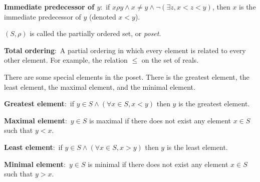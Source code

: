 \documentclass[nobib]{tufte-handout}
\newcommand{\defn}[2]{\noindent\textbf{#1}:\ #2}
\begin{document}
\defn{Immediate predecessor of $y$}{if $x\rho y \land x \neq y \land \neg (\exists z, x < z< y)$, then $x$ is the 
immediate predecessor of $y$ (denoted $x<y$)}. 

$(S, \rho)$ is called the partially ordered set, or \emph{poset}. 

\defn{Total ordering}{A partial ordering in which every element is related to 
every other element}. For example, the relation $\leq$ on the set of reals. 

There are some special elements in the poset. There is the greatest element, 
the least element, the maximal element, and the minimal element. 

\defn{Greatest element}{if $y \in S \land (\forall x \in S, x<y)$
then $y$ is the greatest element.}

\defn{Maximal element}{$y\in S$ is maximal if there does not exist any 
element $x \in S$ such that $y < x$.}

\defn{Least element}{if $y \in S \land (\forall x \in S, x>y)$
then $y$ is the least element.}

\defn{Minimal element}{$y\in S$ is minimal if there does not exist any 
element $x \in S$ such that $y > x$.}

\end{document}
